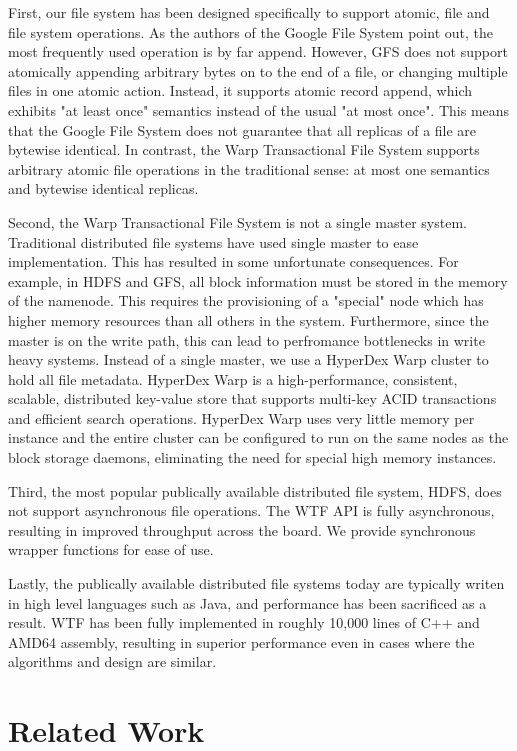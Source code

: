 \documentclass[letterpaper,twocolumn,10pt]{article}
\begin{document}
First, our file system has been designed specifically to support
atomic, file and file system operations.  As the authors of the
Google File System point out, the most frequently used operation
is by far append.  However, GFS does not support atomically
appending arbitrary bytes on to the end of a file, or changing
multiple files in one atomic action.  Instead, it
supports atomic record append, which exhibits "at least once"
semantics instead of the usual "at most once".  This
means that the Google File System does not guarantee that all
replicas of a file are bytewise identical.  In contrast,
the Warp Transactional File System supports arbitrary atomic
file operations in the traditional sense: at most one semantics
and bytewise identical replicas.

Second, the Warp Transactional File System is not a single
master system.  Traditional distributed file systems have used
single master to ease implementation.  This has resulted in some
unfortunate consequences.  For example, in HDFS and GFS, all block
information must be stored in the memory of the namenode.  This requires
the provisioning of a "special" node which has higher memory resources 
than all others in the system.  Furthermore, since the master is on the
write path, this can lead to perfromance bottlenecks in write heavy
systems.  Instead of a single master, we use a HyperDex Warp cluster 
to hold all file metadata.  HyperDex Warp is a high-performance,
consistent, scalable, distributed key-value store that supports
multi-key ACID transactions and efficient search operations.  
HyperDex Warp uses very little memory per instance
and the entire cluster can be configured to run on the same nodes
as the block storage daemons, eliminating the need for special
high memory instances.

Third, the most popular publically available distributed file system,
HDFS, does not support asynchronous file operations.  The WTF
API is fully asynchronous, resulting in improved throughput
across the board.  We provide synchronous wrapper functions
for ease of use.

Lastly, the publically available distributed file systems
today are typically writen in high level languages such as Java,
and performance has been sacrificed as a result. WTF has been
fully implemented in roughly 10,000 lines of C++ and AMD64 assembly,
resulting in superior performance even in cases where the algorithms
and design are similar.

\section{Related Work}
\end{document}
